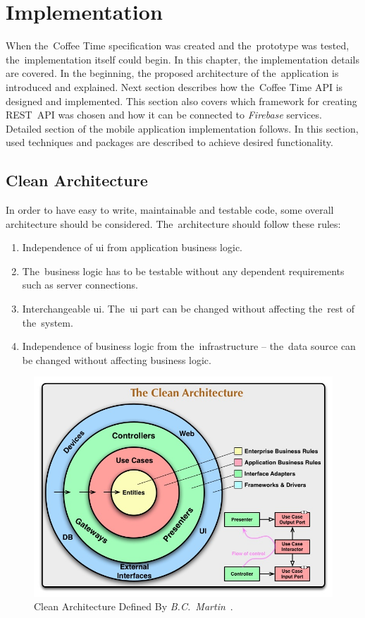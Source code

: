 \chapter{Implementation}
\label{ch:implementation}
When the~Coffee Time specification was created and the~prototype was tested, the~implementation itself could begin. In this chapter, the implementation details are covered. In the beginning, the proposed architecture of the~application is introduced and explained. Next section describes how the~Coffee Time API is designed and implemented. This section also covers which framework for creating REST~API was chosen and how it can be connected to \textit{Firebase} services. Detailed section of the mobile application implementation follows. In this section, used techniques and packages are described to achieve desired functionality. 
\section{Clean Architecture}
In order to have easy to write, maintainable and testable code, some overall architecture should be considered. The~architecture should follow these rules: 
\begin{enumerate}
\item Independence of \gls{ui} from application business logic. 
\item The~business logic has to be testable without any dependent requirements such as server connections.
\item Interchangeable \gls{ui}. The~\gls{ui} part can be changed without affecting the~rest of the~system.
\item Independence of business logic from the~infrastructure -- the~data source can be changed without affecting business logic.
\end{enumerate}

\begin{figure}[ht]
    \centering
    \includegraphics[width=0.75\linewidth]{img/implementation/CleanArchitecture.jpg}
    \caption{Clean Architecture Defined By \textit{B.C.~Martin}~\cite{clean-architecture-article}.}
    \label{fig:clean-arch-bmartin}
\end{figure}

